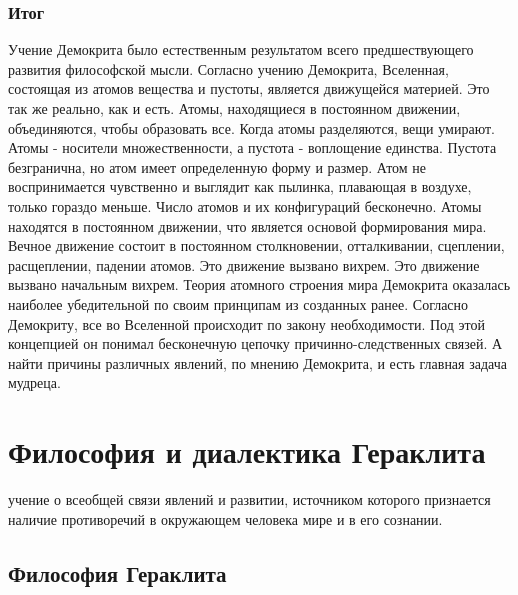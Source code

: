 \documentclass[
]{article}
\providecommand{\tightlist}{%
  \setlength{\itemsep}{0pt}\setlength{\parskip}{0pt}}
\begin{document}
\hypertarget{ux438ux442ux43eux433-1}{%
\subsubsection{Итог}\label{ux438ux442ux43eux433-1}}

Учение Демокрита было естественным результатом всего предшествующего
развития философской мысли. Согласно учению Демокрита, Вселенная,
состоящая из атомов вещества и пустоты, является движущейся материей.
Это так же реально, как и есть. Атомы, находящиеся в постоянном
движении, объединяются, чтобы образовать все. Когда атомы разделяются,
вещи умирают. Атомы - носители множественности, а пустота - воплощение
единства. Пустота безгранична, но атом имеет определенную форму и
размер. Атом не воспринимается чувственно и выглядит как пылинка,
плавающая в воздухе, только гораздо меньше. Число атомов и их
конфигураций бесконечно. Атомы находятся в постоянном движении, что
является основой формирования мира. Вечное движение состоит в постоянном
столкновении, отталкивании, сцеплении, расщеплении, падении атомов. Это
движение вызвано вихрем. Это движение вызвано начальным вихрем. Теория
атомного строения мира Демокрита оказалась наиболее убедительной по
своим принципам из созданных ранее. Согласно Демокриту, все во Вселенной
происходит по закону необходимости. Под этой концепцией он понимал
бесконечную цепочку причинно-следственных связей. А найти причины
различных явлений, по мнению Демокрита, и есть главная задача мудреца.

\hypertarget{ux444ux438ux43bux43eux441ux43eux444ux438ux44f-ux438-ux434ux438ux430ux43bux435ux43aux442ux438ux43aux430-ux433ux435ux440ux430ux43aux43bux438ux442ux430}{%
\section{Философия и диалектика
Гераклита}\label{ux444ux438ux43bux43eux441ux43eux444ux438ux44f-ux438-ux434ux438ux430ux43bux435ux43aux442ux438ux43aux430-ux433ux435ux440ux430ux43aux43bux438ux442ux430}}

\begin{description}
\tightlist
\item[\emph{Диалектика (от греческого dialektike - искусство вести
спор)} ---]
учение о всеобщей связи явлений и развитии, источником которого
признается наличие противоречий в окружающем человека мире и в его
сознании.
\end{description}

\hypertarget{ux444ux438ux43bux43eux441ux43eux444ux438ux44f-ux433ux435ux440ux430ux43aux43bux438ux442ux430}{%
\subsection{Философия
Гераклита}\label{ux444ux438ux43bux43eux441ux43eux444ux438ux44f-ux433ux435ux440ux430ux43aux43bux438ux442ux430}}
\end{document}
